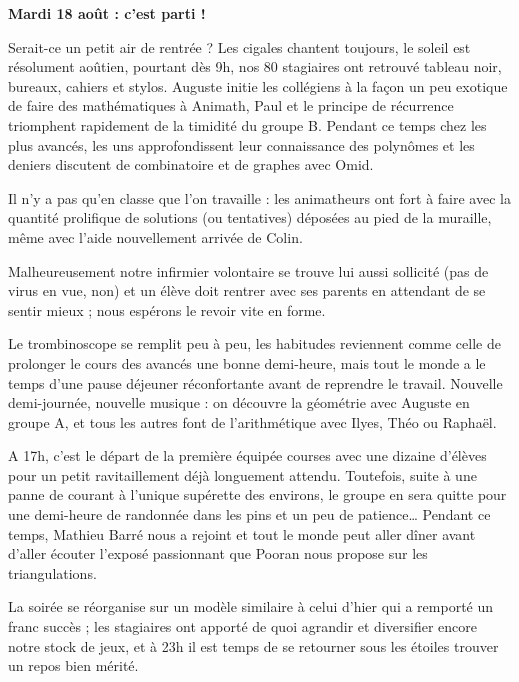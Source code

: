 \begin{center}
{\textbf{Mardi 18 août : c’est parti !}}
\end{center}
\vspace{2mm}

Serait-ce un petit air de rentrée ? Les cigales chantent toujours, le soleil est résolument aoûtien, pourtant dès 9h, nos 80 stagiaires ont retrouvé tableau noir, bureaux, cahiers et stylos. Auguste initie les collégiens à la façon un peu exotique de faire des mathématiques à Animath, Paul et le principe de récurrence triomphent rapidement de la timidité du groupe B. Pendant ce temps chez les plus avancés, les uns approfondissent leur connaissance des polynômes et les deniers discutent de combinatoire et de graphes avec Omid.




Il n’y a pas qu’en classe que l’on travaille : les animatheurs ont fort à faire avec la quantité prolifique de solutions (ou tentatives) déposées au pied de la muraille, même avec l’aide nouvellement arrivée de Colin.


Malheureusement notre infirmier volontaire se trouve lui aussi sollicité (pas de virus en vue, non) et un élève doit rentrer avec ses parents en attendant de se sentir mieux ; nous espérons le revoir vite en forme.

Le trombinoscope se remplit peu à peu, les habitudes reviennent comme celle de prolonger le cours des avancés une bonne demi-heure, mais tout le monde a le temps d’une pause déjeuner réconfortante avant de reprendre le travail. Nouvelle demi-journée, nouvelle musique : on découvre la géométrie avec Auguste en groupe A, et tous les autres font de l’arithmétique avec Ilyes, Théo ou Raphaël.

A 17h, c’est le départ de la première équipée courses avec une dizaine d’élèves pour un petit ravitaillement déjà longuement attendu. Toutefois, suite à une panne de courant à l’unique supérette des environs, le groupe en sera quitte pour une demi-heure de randonnée dans les pins et un peu de patience… Pendant ce temps, Mathieu Barré nous a rejoint et tout le monde peut aller dîner avant d’aller écouter l’exposé passionnant que Pooran nous propose sur les triangulations.




La soirée se réorganise sur un modèle similaire à celui d’hier qui a remporté un franc succès ; les stagiaires ont apporté de quoi agrandir et diversifier encore notre stock de jeux, et à 23h il est temps de se retourner sous les étoiles trouver un repos bien mérité.


